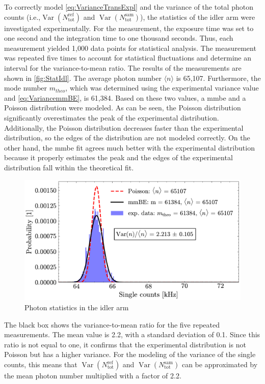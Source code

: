 To correctly model \autoref{eq:VarianceTransExpl} and the variance of the total photon counts (i.e.,$\operatorname{Var}\!\left( N_{\text{tot}}^{\text{ref}} \right)$ and $\operatorname{Var}\!\left( N_{\text{tot}}^{\text{sam}} \right)$), the statistics of the idler arm were investigated experimentally. \newline
For the measurement, the exposure time was set to one second and the integration time to one thousand seconds. Thus, each measurement yielded 1,000 data points for statistical analysis. The measurement was repeated five times to account for statistical fluctuations and determine an interval for the variance-to-mean ratio.
The results of the measurements are shown in \autoref{fig:StatIdl}. \newline
The average photon number $\langle n\rangle$ is 65,107. Furthermore, the mode number $m_{theo}$, which was determined using the experimental variance value and \autoref{eq:VariancemmBE}, is 61,384. Based on these two values, a \acrshort{mmbe} and a Poisson distribution were modeled. As can be seen, the Poisson distribution significantly overestimates the peak of the experimental distribution. Additionally, the Poisson distribution decreases faster than the experimental distribution, so the edges of the distribution are not modeled correctly. On the other hand, the \acrshort{mmbe} fit agrees much better with the experimental distribution because it properly estimates the peak and the edges of the experimental distribution fall within the theoretical fit.
\begin{figure}[tb!]
	\centering
	\includegraphics[width=.9\textwidth]{Images/SingleStatisticsIdler_2.pdf}
	\caption{Photon statistics in the idler arm}
	\label{fig:StatIdl}
\end{figure}\newline
The black box shows the variance-to-mean ratio for the five repeated measurements. The mean value is 2.2, with a standard deviation of 0.1. Since this ratio is not equal to one, it confirms that the experimental distribution is not Poisson but has a higher variance. For the modeling of the variance of the single counts, this means that $\operatorname{Var}\!\left( N_{\text{tot}}^{\text{ref}} \right)$ and $\operatorname{Var}\!\left( N_{\text{tot}}^{\text{sam}} \right)$ can be approximated by the mean photon number multiplied with a factor of 2.2. \newline
